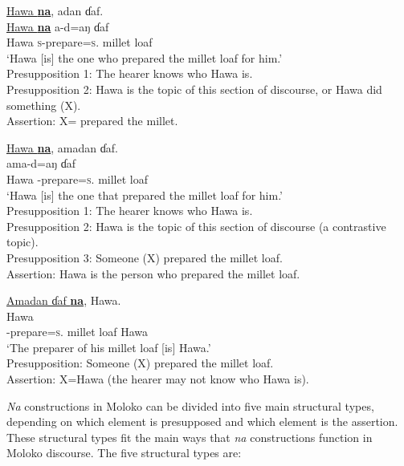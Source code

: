\ea \label{ex:11:9}
\underline{Hawa  \textbf{na}},  adan  ɗaf.\\
\gll  \underline{Hawa  \textbf{na}}  a-d=aŋ      ɗaf\\
      {Hawa  {\PSP}}  \textsc{s}-prepare=\textsc{s}.{\IO}    {millet loaf}\\
\glt  ‘Hawa [is] the one who prepared the millet loaf for him.’\\
  Presupposition 1:    The hearer knows who Hawa is.\\
  Presupposition 2:   Hawa is the topic of this section of discourse, or Hawa did something (X).\\
  Assertion:     X= prepared the millet.
\z

\ea \label{ex:11:10}
\underline{Hawa  \textbf{na}},  amadan  ɗaf.\\
\gll  {}    ama-d=aŋ    ɗaf\\
      Hawa  {\PSP}  {\DEP}-prepare=\textsc{s}.{\IO}  {millet loaf}\\
\glt  ‘Hawa [is] the one that prepared the millet loaf for him.’\\
  Presupposition 1:    The hearer knows who Hawa is.\\
Presupposition 2:    Hawa is the topic of this section of discourse (a contrastive topic).\\
  Presupposition 3:    Someone (X) prepared the millet loaf.\\
  Assertion:     Hawa is the person who prepared the millet loaf.
\z

\ea \label{ex:11:11}
\underline{Amadan  ɗaf  \textbf{na}},  Hawa.\\
\gll  {}          Hawa\\
     {\DEP}-prepare=\textsc{s}.{\IO}  {millet loaf}  {\PSP}  Hawa\\
\glt  ‘The preparer of his millet loaf [is] Hawa.’ \\
  Presupposition:     Someone (X) prepared the millet loaf.\\
  Assertion:     X=Hawa (the hearer may not know who Hawa is).  
\z

\textit{Na} constructions in Moloko can be divided into five main structural types, depending on which element is presupposed and which element is the assertion. These structural types fit the main ways that \textit{na} constructions function in Moloko discourse. The five structural types are: 

